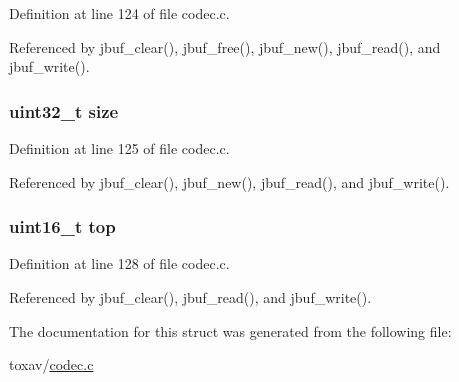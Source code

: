 Definition at line 124 of file codec.\+c.



Referenced by jbuf\+\_\+clear(), jbuf\+\_\+free(), jbuf\+\_\+new(), jbuf\+\_\+read(), and jbuf\+\_\+write().

\hypertarget{struct___jitter_buffer_ab2c6b258f02add8fdf4cfc7c371dd772}{
\subsubsection[{size}]{\setlength{\rightskip}{0pt plus 5cm}uint32\+\_\+t size}}\label{struct___jitter_buffer_ab2c6b258f02add8fdf4cfc7c371dd772}


Definition at line 125 of file codec.\+c.



Referenced by jbuf\+\_\+clear(), jbuf\+\_\+new(), jbuf\+\_\+read(), and jbuf\+\_\+write().

\hypertarget{struct___jitter_buffer_a0c235a6df98714bb18538fc0afc5bad1}{
\subsubsection[{top}]{\setlength{\rightskip}{0pt plus 5cm}uint16\+\_\+t top}}\label{struct___jitter_buffer_a0c235a6df98714bb18538fc0afc5bad1}


Definition at line 128 of file codec.\+c.



Referenced by jbuf\+\_\+clear(), jbuf\+\_\+read(), and jbuf\+\_\+write().



The documentation for this struct was generated from the following file\+:\begin{DoxyCompactItemize}
\item 
toxav/\hyperlink{codec_8c}{codec.\+c}\end{DoxyCompactItemize}
